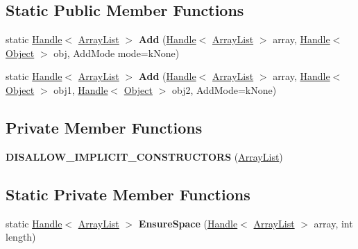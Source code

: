 \subsection*{Static Public Member Functions}
\begin{DoxyCompactItemize}
\item 
static \hyperlink{classv8_1_1internal_1_1_handle}{Handle}$<$ \hyperlink{classv8_1_1internal_1_1_array_list}{Array\+List} $>$ {\bfseries Add} (\hyperlink{classv8_1_1internal_1_1_handle}{Handle}$<$ \hyperlink{classv8_1_1internal_1_1_array_list}{Array\+List} $>$ array, \hyperlink{classv8_1_1internal_1_1_handle}{Handle}$<$ \hyperlink{classv8_1_1internal_1_1_object}{Object} $>$ obj, Add\+Mode mode=k\+None)\hypertarget{classv8_1_1internal_1_1_array_list_a333de52fea519b21742427c13b6efa7f}{}\label{classv8_1_1internal_1_1_array_list_a333de52fea519b21742427c13b6efa7f}

\item 
static \hyperlink{classv8_1_1internal_1_1_handle}{Handle}$<$ \hyperlink{classv8_1_1internal_1_1_array_list}{Array\+List} $>$ {\bfseries Add} (\hyperlink{classv8_1_1internal_1_1_handle}{Handle}$<$ \hyperlink{classv8_1_1internal_1_1_array_list}{Array\+List} $>$ array, \hyperlink{classv8_1_1internal_1_1_handle}{Handle}$<$ \hyperlink{classv8_1_1internal_1_1_object}{Object} $>$ obj1, \hyperlink{classv8_1_1internal_1_1_handle}{Handle}$<$ \hyperlink{classv8_1_1internal_1_1_object}{Object} $>$ obj2, Add\+Mode=k\+None)\hypertarget{classv8_1_1internal_1_1_array_list_a24b7217a2e2b4548515575ef53f05c4c}{}\label{classv8_1_1internal_1_1_array_list_a24b7217a2e2b4548515575ef53f05c4c}

\end{DoxyCompactItemize}
\subsection*{Private Member Functions}
\begin{DoxyCompactItemize}
\item 
{\bfseries D\+I\+S\+A\+L\+L\+O\+W\+\_\+\+I\+M\+P\+L\+I\+C\+I\+T\+\_\+\+C\+O\+N\+S\+T\+R\+U\+C\+T\+O\+RS} (\hyperlink{classv8_1_1internal_1_1_array_list}{Array\+List})\hypertarget{classv8_1_1internal_1_1_array_list_af83c9bc5fe2092595058c8db909de241}{}\label{classv8_1_1internal_1_1_array_list_af83c9bc5fe2092595058c8db909de241}

\end{DoxyCompactItemize}
\subsection*{Static Private Member Functions}
\begin{DoxyCompactItemize}
\item 
static \hyperlink{classv8_1_1internal_1_1_handle}{Handle}$<$ \hyperlink{classv8_1_1internal_1_1_array_list}{Array\+List} $>$ {\bfseries Ensure\+Space} (\hyperlink{classv8_1_1internal_1_1_handle}{Handle}$<$ \hyperlink{classv8_1_1internal_1_1_array_list}{Array\+List} $>$ array, int length)\hypertarget{classv8_1_1internal_1_1_array_list_a67f1fcabc5847c3f452d03e97ecb5adc}{}\label{classv8_1_1internal_1_1_array_list_a67f1fcabc5847c3f452d03e97ecb5adc}

\end{DoxyCompactItemize}
